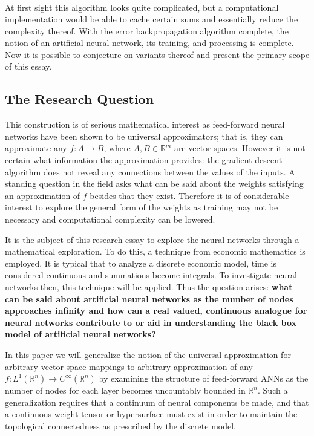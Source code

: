 \begin{equation}
\begin{aligned}
	\end{aligned}
\end{equation} At first sight this algorithm looks quite complicated, but a computational implementation would be able to cache certain sums and essentially reduce the complexity thereof. With the error backpropagation algorithm complete, the notion of an artificial neural network, its training, and processing is complete. Now it is possible to conjecture on variants thereof and present the primary scope of this essay.
\subsection{The Research Question}
This construction is of serious mathematical interest as feed-forward neural networks have been shown to be universal approximators; that is, they can approximate any \(f:A\to B\), where \(A,B \in \mathbb{R}^m\) are vector spaces. However it is not certain what information the approximation provides: the gradient descent algorithm does not reveal any connections between the values of the inputs.  A standing question in the field asks what can be said about the weights satisfying an approximation of $f$ besides that they exist. Therefore it is of considerable interest to explore the general form of the weights as training may not be necessary and computational complexity can be lowered.

It is the subject of this research essay to explore the neural networks through a mathematical exploration. To do this, a technique from economic mathematics is employed. It is typical that to analyze a discrete economic model, time is considered continuous and summations become integrals. To investigate neural networks then, this technique will be applied. Thus the question arises: \textbf{what can be said about artificial neural networks as the number of nodes approaches infinity and how can a real valued, continuous analogue for neural networks contribute to or aid in understanding the black box model of artificial neural networks?  }


In this paper we will generalize the notion of the universal approximation for arbitrary vector space mappings to arbitrary approximation of any \(f:L^1 (\mathbb{R}^n)\to C^\infty(\mathbb{R}^n)\) by examining the structure of feed-forward ANNs as the number of nodes for each layer becomes uncountably bounded in \(\mathbb{R}^n\). Such a generalization requires that a continuum of neural components be made, and that a continuous weight tensor or hypersurface must exist in order to maintain the topological connectedness as prescribed by the discrete model.